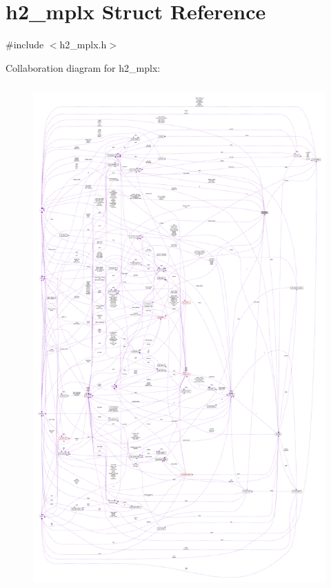 \hypertarget{structh2__mplx}{}\section{h2\+\_\+mplx Struct Reference}
\label{structh2__mplx}


{\ttfamily \#include $<$h2\+\_\+mplx.\+h$>$}



Collaboration diagram for h2\+\_\+mplx\+:
\nopagebreak
\begin{figure}[H]
\begin{center}
\leavevmode
\includegraphics[height=550pt]{structh2__mplx__coll__graph}
\end{center}
\end{figure}
